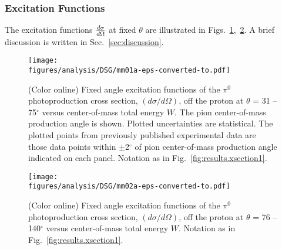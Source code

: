 \subsubsection{Excitation Functions}
\label{ExtFun}
The excitation functions $\frac{\lowercase{d}\sigma}{\lowercase{d}\Omega}$ at fixed $\theta$ are illustrated in Figs.~\ref{fig:wdist},~\ref{fig:wdist2}. A brief discussion is written in Sec.~\ref{sec:discussion}.
\begin{figure}[h!]\begin{center}
\texttt{[image: \\figures/analysis/DSG/mm01a-eps-converted-to.pdf]}
\caption[Fixed angle excitation functions of the $\pi^0$ photoproduction cross section, $(d\sigma/d\Omega)$, off the proton at $\theta$ = 31 -- 75$^\circ$ versus center-of-mass total energy $W$]{\label{fig:wdist}(Color online) Fixed angle excitation functions of the $\pi^0$ photoproduction cross section, $(d\sigma/d\Omega)$, off the proton at $\theta$ = 31 -- 75$^\circ$ versus center-of-mass total energy $W$. The pion center-of-mass production angle is shown. Plotted uncertainties are statistical. The plotted points from previously published experimental data are those data points within $\pm$2$^\circ$ of pion center-of-mass production angle indicated on each panel. Notation as in Fig.~\protect\ref{fig:results.xsection1}.}
\end{center}\end{figure}


\begin{figure}[h!]\begin{center}
\texttt{[image: \\figures/analysis/DSG/mm02a-eps-converted-to.pdf]}
\caption[Fixed angle excitation functions of the $\pi^0$ photoproduction cross section, $(d\sigma/d\Omega)$, off the proton at $\theta$ = 76 -- 140$^\circ$ versus center-of-mass total energy $W$]{\label{fig:wdist2}(Color online) Fixed angle excitation functions of the $\pi^0$ photoproduction cross section, $(d\sigma/d\Omega)$, off the proton at $\theta$ = 76 -- 140$^\circ$ versus center-of-mass total energy $W$. Notation as in Fig.~\protect\ref{fig:results.xsection1}.}
\end{center}\end{figure}


\FloatBarrier
\clearpage
